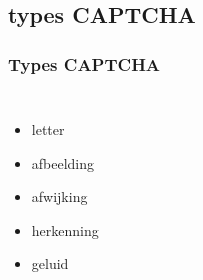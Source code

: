 \documentclass{beamer}
\begin{document}
\subsection{types CAPTCHA}
\begin{frame}
\frametitle{Types CAPTCHA}
   \begin{columns}[c]
       \begin{itemize}
  	     \item<+-> letter
  	     \item<+-> afbeelding
  	     \item<+-> afwijking
  	     \item<+-> herkenning
  	     \item<+-> geluid
       \end{itemize}
       \begin{center}

\end{center}
\end{columns}
\end{frame}
\end{document}
